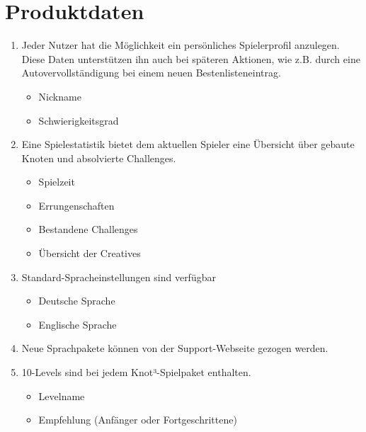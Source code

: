 \chapter{Produktdaten}

\renewcommand{\theenumi}{/PD\_\arabic{enumi}0/}
\renewcommand{\labelenumi}{\theenumi}

\begin{enumerate}

\item Jeder Nutzer hat die Möglichkeit ein persönliches Spielerprofil anzulegen. Diese Daten unterstützen ihn auch bei späteren Aktionen, wie z.B. durch eine Autovervollständigung bei einem neuen Bestenlisteneintrag. 

  \begin{itemize}
     \item Nickname
     \item Schwierigkeitsgrad
  \end{itemize}

\item Eine Spielestatistik bietet dem aktuellen Spieler eine Übersicht über gebaute Knoten und absolvierte Challenges.

  \begin{itemize}
     \item Spielzeit
     \item Errungenschaften
     \item Bestandene Challenges
     \item Übersicht der Creatives
  \end{itemize}

\item Standard-Spracheinstellungen sind verfügbar

  \begin{itemize}
     \item Deutsche Sprache
     \item Englische Sprache
  \end{itemize}
  
\item Neue Sprachpakete können von der Support-Webseite gezogen werden.
\item 10-Levels sind bei jedem Knot³-Spielpaket enthalten.

  \begin{itemize}
     \item Levelname
     \item Empfehlung (Anfänger oder Fortgeschrittene)
  \end{itemize}


\end{enumerate}

